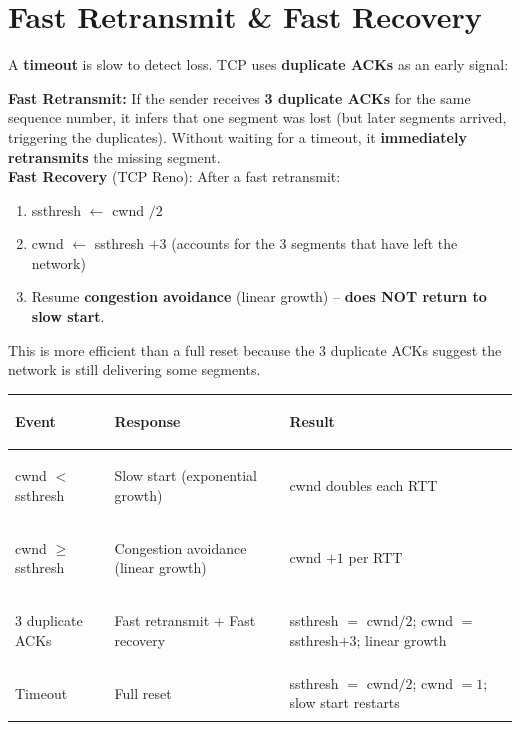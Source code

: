 \documentclass[11pt, letterpaper]{article}
\begin{document}
\section*{Fast Retransmit \& Fast Recovery}

A \textbf{timeout} is slow to detect loss. TCP uses \textbf{duplicate ACKs} as an early signal:

\begin{tcolorbox}[colback=part4bg, colframe=sectionorange, arc=3pt, boxrule=1pt]
\textbf{Fast Retransmit:} If the sender receives \textbf{3 duplicate ACKs} for the same sequence number, it infers that one segment was lost (but later segments arrived, triggering the duplicates). Without waiting for a timeout, it \textbf{immediately retransmits} the missing segment.\\[4pt]
\textbf{Fast Recovery} (TCP Reno): After a fast retransmit:
\begin{enumerate}[noitemsep, leftmargin=*]
  \item ssthresh $\leftarrow$ cwnd $/ 2$
  \item cwnd $\leftarrow$ ssthresh $+ 3$ (accounts for the 3 segments that have left the network)
  \item Resume \textbf{congestion avoidance} (linear growth) -- \textbf{does NOT return to slow start}.
\end{enumerate}
This is more efficient than a full reset because the 3 duplicate ACKs suggest the network is still delivering some segments.
\end{tcolorbox}

\noindent
{\renewcommand{\arraystretch}{1.5}
\begin{tabularx}{\textwidth}{>{\bfseries\raggedright\arraybackslash}p{4cm}
                              >{\raggedright\arraybackslash}X
                              >{\raggedright\arraybackslash}X}
\toprule
\rowcolor{tableheaderorange}
\textbf{Event} & \textbf{Response} & \textbf{Result} \\
\midrule
\rowcolor{rowOr} cwnd $<$ ssthresh & Slow start (exponential growth) & cwnd doubles each RTT \\
\rowcolor{rowA} cwnd $\geq$ ssthresh & Congestion avoidance (linear growth) & cwnd $+1$ per RTT \\
\rowcolor{rowOr} 3 duplicate ACKs & Fast retransmit + Fast recovery & ssthresh $= $ cwnd$/2$; cwnd $=$ ssthresh$+3$; linear growth \\
\rowcolor{rowA} Timeout & Full reset & ssthresh $=$ cwnd$/2$; cwnd $= 1$; slow start restarts \\
\bottomrule
\end{tabularx}}
\end{document}
